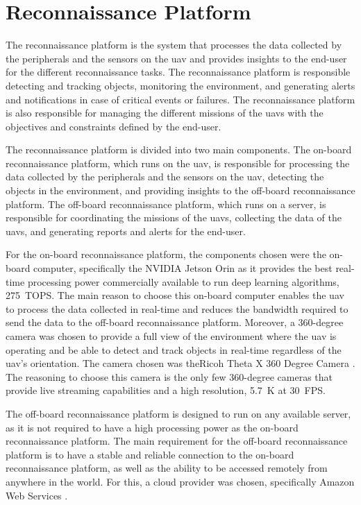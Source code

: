 \section{Reconnaissance Platform}\label{sec:design_reconnaissance_platform}

The reconnaissance platform is the system that processes the data collected by the peripherals and the sensors on the \gls{uav} and provides insights to the end-user for the different reconnaissance tasks. The reconnaissance platform is responsible detecting and tracking objects, monitoring the environment, and generating alerts and notifications in case of critical events or failures. The reconnaissance platform is also responsible for managing the different missions of the \glspl{uav} with the objectives and constraints defined by the end-user.

The reconnaissance platform is divided into two main components. The on-board reconnaissance platform, which runs on the \gls{uav}, is responsible for processing the data collected by the peripherals and the sensors on the \gls{uav}, detecting the objects in the environment, and providing insights to the off-board reconnaissance platform. The off-board reconnaissance platform, which runs on a server, is responsible for coordinating the missions of the \glspl{uav}, collecting the data of the \glspl{uav}, and generating reports and alerts for the end-user.

For the on-board reconnaissance platform, the components chosen were the on-board computer, specifically the NVIDIA Jetson Orin \autocite{nvidiaNVIDIAJetson} as it provides the best real-time processing power commercially available to run deep learning algorithms, \SI{275}{TOPS}. The main reason to choose this on-board computer enables the \gls{uav} to process the data collected in real-time and reduces the bandwidth required to send the data to the off-board reconnaissance platform. Moreover, a 360-degree camera was chosen to provide a full view of the environment where the \gls{uav} is operating and be able to detect and track objects in real-time regardless of the \gls{uav}'s orientation. The camera chosen was theRicoh Theta X 360 Degree Camera \autocite{ricohimagingTHETARicoh}. The reasoning to choose this camera is the only few 360-degree cameras that provide live streaming capabilities and a high resolution, \SI{5.7}{K} at \SI{30}{FPS}.

The off-board reconnaissance platform is designed to run on any available server, as it is not required to have a high processing power as the on-board reconnaissance platform. The main requirement for the off-board reconnaissance platform is to have a stable and reliable connection to the on-board reconnaissance platform, as well as the ability to be accessed remotely from anywhere in the world. For this, a cloud provider was chosen, specifically Amazon Web Services \autocite{amazonCloudComputing}.

